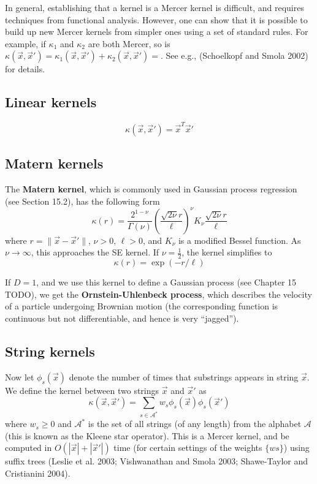 In general, establishing that a kernel is a Mercer kernel is difficult, and requires techniques from functional analysis. However, one can show that it is possible to build up new Mercer kernels from simpler ones using a set of standard rules. For example, if $\kappa_1$ and $\kappa_2$ are both Mercer, so is $\kappa(\vec{x},\vec{x}')=\kappa_1(\vec{x},\vec{x}')+\kappa_2(\vec{x},\vec{x}')=$. See e.g., (Schoelkopf and Smola 2002) for details.


\subsection{Linear kernels}
\begin{equation}
\kappa(\vec{x},\vec{x}')=\vec{x}^T\vec{x}'
\end{equation}

\subsection{Matern kernels}
The \textbf{Matern kernel}, which is commonly used in Gaussian process regression (see Section 15.2), has the following form
\begin{equation}
\kappa(r)=\frac{2^{1-\nu}}{\Gamma(\nu)}\left(\frac{\sqrt{2\nu}r}{\ell}\right)^{\nu}K_{\nu}\frac{\sqrt{2\nu}r}{\ell}
\end{equation}
where $r=\lVert\vec{x}-\vec{x}'\rVert$, $\nu>0$, $\ell>0$, and $K_{\nu}$ is a modified Bessel function. As $\nu \rightarrow \infty$, this approaches the SE kernel. If $\nu=\frac{1}{2}$, the kernel simplifies to
\begin{equation}
\kappa(r)=\exp(-r/\ell)
\end{equation}

If $D=1$, and we use this kernel to define a Gaussian process (see Chapter 15 TODO), we get the \textbf{Ornstein-Uhlenbeck process}, which describes the velocity of a particle undergoing Brownian motion (the corresponding function is continuous but not differentiable, and hence is very “jagged”).


\subsection{String kernels}
\label{sec:String-kernels}
Now let $\phi_s(\vec{x})$ denote the number of times that substrings appears in string $\vec{x}$. We define the kernel between two strings $\vec{x}$ and $\vec{x}'$ as
\begin{equation}
\kappa(\vec{x},\vec{x}')=\sum\limits_{s \in \mathcal{A}^*} w_s\phi_s(\vec{x})\phi_s(\vec{x}')
\end{equation}
where $w_s \geq 0$ and $\mathcal{A}^*$ is the set of all strings (of any length) from the alphabet $\mathcal{A}$(this is known as the Kleene star operator). This is a Mercer kernel, and be computed in $O(|\vec{x}|+|\vec{x}'|)$ time (for certain settings of the weights $\{ws\}$) using suffix trees (Leslie et al. 2003; Vishwanathan and Smola 2003; Shawe-Taylor and Cristianini 2004).


